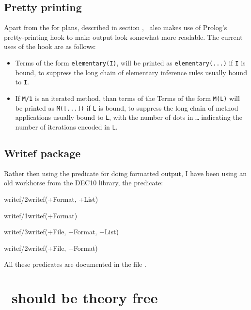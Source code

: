 \subsection {Pretty printing}

Apart from the  for plans, described in section
, \clam\ also makes use of Prolog's 
pretty-printing hook to make output look somewhat more readable. The
current uses of the  hook are as follows:
\begin{itemize}
\item
Terms of the form {\tt elementary(I)}, will be printed as
{\tt elementary(...)} if {\tt I} is bound, to suppress the long chain of
elementary inference rules usually bound to {\tt I}.
\item
If {\tt M/1} is an iterated method, than terms of the 
Terms of the form {\tt M(L)}
will be printed as
{\tt M([...])} if {\tt L} is bound, to suppress the long
chain of method applications usually bound to {\tt L}, with the number
of dots in {\tt \ldots} indicating the number of iterations encoded
in {\tt L}. 
\end{itemize} 

\subsection {Writef package}

Rather then using the   predicate for doing
formatted output, I have been using an old workhorse from the
DEC10 library, the  predicate:

\begin{predicate}{writef/2}{writef(+Format, +List)}\end{predicate}%
\begin{predicate}{writef/1}{writef(+Format)}\end{predicate}%
\begin{predicate}{writef/3}{writef(+File, +Format, +List)}\end{predicate}%
\begin{predicate}{writef/2}{writef(+File, +Format)}\end{predicate}%
All these predicates are documented in the file {\tt {}}.

\section [Theory-free]{\protect\clam\ should be theory free}
\label{theory free}


